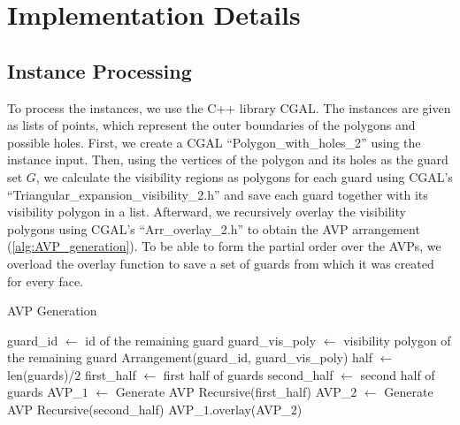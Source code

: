 \chapter{Implementation Details}\label{ch:implementation_details}

\section{Instance Processing}
To process the instances, we use the C++ library CGAL.
The instances are given as lists of points, which represent the outer boundaries of the polygons and possible holes. First, we create a CGAL ``Polygon\_with\_holes\_2'' using the instance input. Then, using the vertices of the polygon and its holes as the guard set $G$, we calculate the visibility regions as polygons for each guard using CGAL's ``Triangular\_expansion\_visibility\_2.h'' and save each guard together with its visibility polygon in a list. Afterward, we recursively overlay the visibility polygons using CGAL's ``Arr\_overlay\_2.h'' to obtain the AVP arrangement (\cref{alg:AVP_generation}). To be able to form the partial order over the AVPs, we overload the overlay function to save a set of guards from which it was created for every face. 

\begin{algorithm}
\caption{AVP Generation}\label{alg:AVP_generation}
\fontsize{10}{12}\selectfont
\begin{algorithmic} 
    \State guard\_id $\gets$ id of the remaining guard
    \State guard\_vis\_poly $\gets$ visibility polygon of the remaining guard
    \State \Return Arrangement(guard\_id, guard\_vis\_poly)
\Else
    \State half $\gets$ len(guards)/$2$
    \State first\_half $\gets$ first half of guards
    \State second\_half $\gets$ second half of guards
    \State AVP\_$1$ $\gets$ Generate AVP Recursive(first\_half)
    \State AVP\_$2$ $\gets$ Generate AVP Recursive(second\_half)
    \State \Return AVP\_$1$.overlay(AVP\_$2$)
\EndIf
\EndProcedure
\end{algorithmic}
\end{algorithm}

